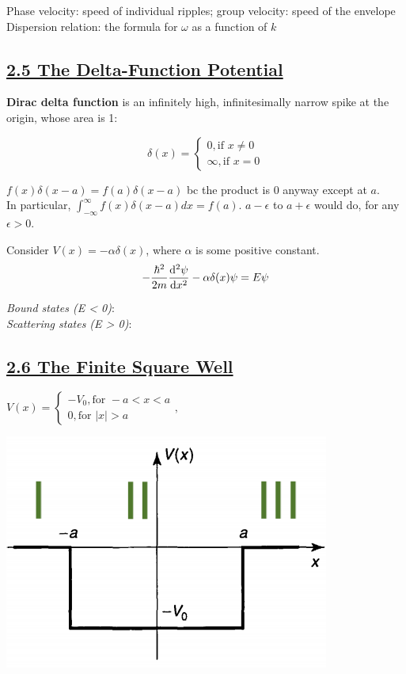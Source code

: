 Phase velocity: speed of individual ripples; group velocity: speed of the envelope \\

Dispersion relation: the formula for $\omega$ as a function of $k$

\subsection{\underline{2.5 The Delta-Function Potential}}

\textbf{Dirac delta function} is an infinitely high, infinitesimally narrow spike at the origin, whose area is 1:

    $$\delta(x) = \begin{cases} 0, \textrm{if } x \neq 0 \\ \infty, \textrm{if } x = 0 \end{cases}$$

$f(x) \delta(x - a) = f(a) \delta(x - a)$ bc the product is 0 anyway except at $a$. \\

In particular, $\int_{-\infty}^{\infty} f(x) \delta(x-a) dx = f(a)$. $a - \epsilon$ to $a + \epsilon$ would do, for any $\epsilon > 0$.

Consider $V(x) = -\alpha \delta(x)$, where $\alpha$ is some positive constant. \\

$$-\frac{\hbar^2}{2m} \dv[2]{\psi}{x} - \alpha \delta(x) \psi = E \psi$$

\textit{Bound states (E < 0)}: \\

\textit{Scattering states (E > 0)}: \\



\subsection{\underline{2.6 The Finite Square Well}}
$V(x) = \begin{cases} -V_{0}, \textrm{for } -a < x < a \\ 0, \textrm{for } |x| > a \end{cases},$ 

\vspace{-5em}
\begin{Figure}
    \raggedleft
    \includegraphics[width=0.3\columnwidth]{figures/finite_square_well.png}
\end{Figure}
\vspace{-2em}

